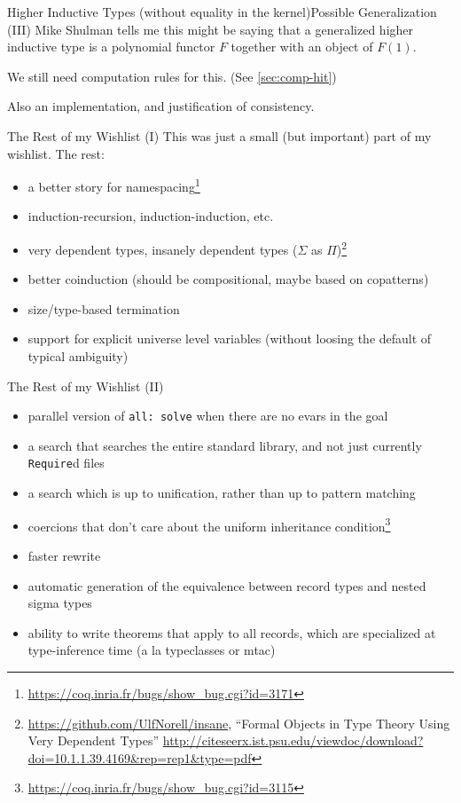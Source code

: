 \documentclass{beamer}
\begin{document}
\begin{frame}{Higher Inductive Types (without equality in the kernel)}{Possible Generalization (III)}
  \Large
  Mike Shulman tells me this might be saying that a generalized higher inductive type is a polynomial functor $F$ together with an object of $F(1)$. \pause
  
  We still need computation rules for this.  \pause (See \autoref{sec:comp-hit}) \pause
  
  Also an implementation, and justification of consistency.
\end{frame}




\begin{frame}{The Rest of my Wishlist (I)}
This was just a small (but important) part of my wishlist.  The rest:

\begin{itemize}
  \item
    a better story for namespacing\footnote{\url{https://coq.inria.fr/bugs/show\_bug.cgi?id=3171}}
  \item 
    induction-recursion, induction-induction, etc.
  \item
    very dependent types, insanely dependent types ($\Sigma$ as $\Pi$)\footnote{\url{https://github.com/UlfNorell/insane}, ``Formal Objects in Type Theory Using Very Dependent Types'' \url{http://citeseerx.ist.psu.edu/viewdoc/download?doi=10.1.1.39.4169&rep=rep1&type=pdf}}
  \item 
    better coinduction (should be compositional, maybe based on copatterns)
  \item 
    size/type-based termination
  \item 
    support for explicit universe level variables (without loosing the default of typical ambiguity)
\end{itemize}
\end{frame}

\begin{frame}{The Rest of my Wishlist (II)}
\begin{itemize}
  \item
    parallel version of \texttt{all: solve} when there are no evars in the goal
  \item 
    a search that searches the entire standard library, and not just currently \texttt{Require}d files
  \item 
    a search which is up to unification, rather than up to pattern matching
  \item 
    coercions that don't care about the uniform inheritance condition\footnote{\url{https://coq.inria.fr/bugs/show\_bug.cgi?id=3115}}
  \item 
    faster rewrite
  \item 
    automatic generation of the equivalence between record types and nested sigma types
  \item 
    ability to write theorems that apply to all records, which are specialized at type-inference time (a la typeclasses or mtac)
\end{itemize}
\end{frame}
\end{document}
